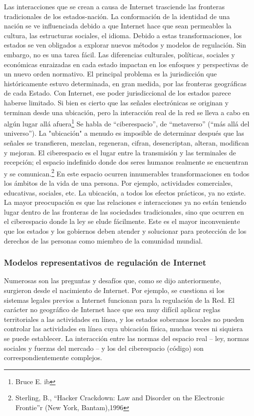 \documentclass[12pt]{report} %
\begin{document}
Las interacciones que se crean a causa de Internet trasciende las fronteras tradicionales de los estados-nación. La conformación de la identidad de una nación se ve influenciada debido a que Internet hace que sean permeables la cultura, las estructuras sociales, el idioma. Debido a estas transformaciones, los estados se ven obligados a explorar nuevos métodos y modelos de regulación. Sin embargo, no es una tarea fácil. Las diferencias culturales, políticas, sociales y económicas enraizadas en cada estado impactan en los enfoques y perspectivas de un nuevo orden normativo. El principal problema es la jurisdicción que históricamente estuvo determinada, en gran medida, por las fronteras geográficas  de cada Estado. Con Internet, ese poder jurisdiccional de los estados parece haberse limitado. Si bien es cierto que las señales electrónicas se originan y terminan desde una ubicación, pero la interacción real de la red se lleva a cabo en algún lugar allá afuera\footnote{  Bruce E. ib}  Se habla de “ciberespacio”, de “metaverso” (“más allá del universo”). La "ubicación" a menudo es imposible de determinar después que las señales se transfieren, mezclan, regeneran, cifran, desencriptan, alteran, modifican y mejoran. El ciberespacio es el lugar entre la transmisión y las terminales de recepción; el espacio indefinido donde dos seres humanos realmente se encuentran y se comunican.\footnote{Sterling, B., “Hacker Crackdown: Law and Disorder on the Electronic Frontie”r (New York, Bantam),1996} En este espacio ocurren innumerables transformaciones en todos los ámbitos de la vida de una persona. Por ejemplo, actividades comerciales, educativas, sociales, etc. La ubicación, a todos los efectos prácticos, ya no existe. La mayor preocupación es que las relaciones e interacciones ya no están teniendo lugar dentro de las fronteras de las sociedades tradicionales, sino que ocurren en el ciberespacio donde la ley se elude fácilmente. Este es el mayor inconveniente que los estados y los gobiernos deben atender y solucionar para protección de los derechos de las personas como miembro de la comunidad mundial.


\subsubsection{Modelos representativos de regulación de Internet}

Numerosas son las preguntas y desafíos que, como se dijo anteriormente, surgieron desde el nacimiento de Internet. Por ejemplo, se cuestiona si los sistemas legales previos a Internet funcionan para la regulación de la Red. El carácter no geográfico de Internet hace que sea muy difícil aplicar reglas territoriales a las actividades en línea, y los estados soberanos locales no pueden controlar las actividades en línea cuya ubicación física, muchas veces ni siquiera se puede establecer. La interacción entre las normas del espacio real – ley, normas sociales y fuerzas del mercado – y los del ciberespacio (código) son correspondientemente complejos. 
\end{document}
